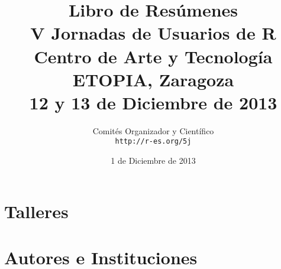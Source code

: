 \documentclass[a4paper, 12pt]{memoir}
\renewcommand{\partname}{Parte}
\begin{document}
\frontmatter

\begin{titlingpage}

  \title{
    \Large{Libro de Resúmenes}\\
    \Huge{V Jornadas de Usuarios de R}\\
    \vspace{15pt}
    \Large{Centro de Arte y Tecnología ETOPIA, Zaragoza}\\
    \large{12 y 13 de Diciembre de 2013}\\
  }

  \author{
    Comités Organizador y Científico\\
    \texttt{http://r-es.org/5j}}

  \date{1 de Diciembre de 2013}

  \maketitle


\end{titlingpage}




\cleardoublepage

\tableofcontents

\cleardoublepage



\mainmatter

\renewcommand{\partname}{Sesión de Comunicaciones}

\part[Comunicaciones Jueves]{}
\label{part:comunicacionesI}



\part[Comunicaciones Viernes]{}
\label{part:comunicacionesII}





\part{Talleres}
\label{part:talleres}





\backmatter


\part{Autores e Instituciones}

\pagestyle{index}

\renewcommand{\indexname}{Índice de autores}

\printindex

\renewcommand{\indexname}{Índice de Instituciones}

\printindex[inst]
\end{document}
